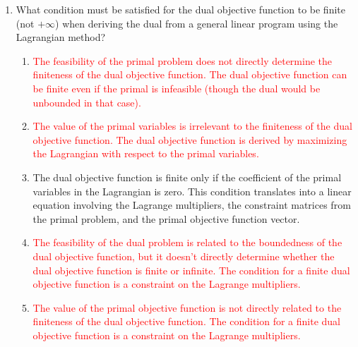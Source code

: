 \documentclass{article}%
\newcommand{\incorrect}[1]{\textcolor{red}{#1}}
\begin{document}
\begin{enumerate}
\begin{enumerate}
\item \incorrect{This is incorrect. It is the opposite of weak duality. Weak duality states that the primal optimal value is less than or equal to the dual optimal value.}%
\item \incorrect{This is incorrect. Weak duality establishes a fundamental relationship between the optimal values of the primal and dual problems.}%
\item Weak duality states that the optimal objective function value of the primal problem is always less than or equal to the optimal objective function value of the dual problem. This holds regardless of whether the problems are feasible or infeasible.%
\end{enumerate}%
\vspace{1em}%
\item What condition must be satisfied for the dual objective function to be finite (not $+\infty$) when deriving the dual from a general linear program using the Lagrangian method?%
\begin{enumerate}%
\item \incorrect{The feasibility of the primal problem does not directly determine the finiteness of the dual objective function.  The dual objective function can be finite even if the primal is infeasible (though the dual would be unbounded in that case).}%
\item \incorrect{The value of the primal variables is irrelevant to the finiteness of the dual objective function. The dual objective function is derived by maximizing the Lagrangian with respect to the primal variables.}%
\item The dual objective function is finite only if the coefficient of the primal variables in the Lagrangian is zero. This condition translates into a linear equation involving the Lagrange multipliers, the constraint matrices from the primal problem, and the primal objective function vector.%
\item \incorrect{The feasibility of the dual problem is related to the boundedness of the dual objective function, but it doesn't directly determine whether the dual objective function is finite or infinite.  The condition for a finite dual objective function is a constraint on the Lagrange multipliers.}%
\item \incorrect{The value of the primal objective function is not directly related to the finiteness of the dual objective function. The condition for a finite dual objective function is a constraint on the Lagrange multipliers.}%

\end{enumerate}
\end{enumerate}
\end{document}
